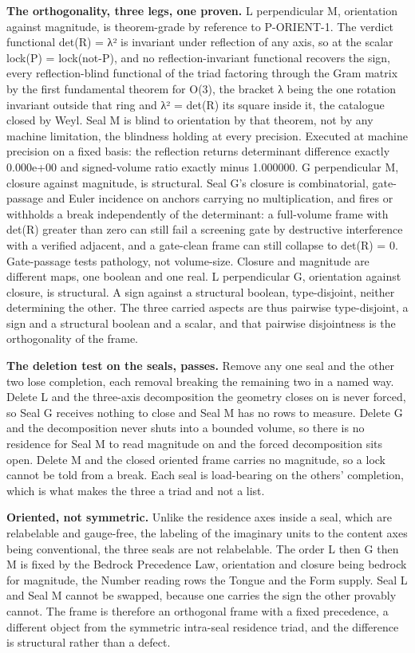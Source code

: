 \documentclass[10pt,twocolumn]{article}
\begin{document}
\textbf{The orthogonality, three legs, one proven.} L perpendicular M,
orientation against magnitude, is theorem-grade by reference to
P-ORIENT-1. The verdict functional det(R) = λ² is invariant under
reflection of any axis, so at the scalar lock(P) = lock(not-P), and no
reflection-invariant functional recovers the sign, every
reflection-blind functional of the triad factoring through the Gram
matrix by the first fundamental theorem for O(3), the bracket λ being
the one rotation invariant outside that ring and λ² = det(R) its square
inside it, the catalogue closed by Weyl. Seal M is blind to orientation
by that theorem, not by any machine limitation, the blindness holding at
every precision. Executed at machine precision on a fixed basis: the
reflection returns determinant difference exactly 0.000e+00 and
signed-volume ratio exactly minus 1.000000. G perpendicular M, closure
against magnitude, is structural. Seal G's closure is combinatorial,
gate-passage and Euler incidence on anchors carrying no multiplication,
and fires or withholds a break independently of the determinant: a
full-volume frame with det(R) greater than zero can still fail a
screening gate by destructive interference with a verified adjacent, and
a gate-clean frame can still collapse to det(R) = 0. Gate-passage tests
pathology, not volume-size. Closure and magnitude are different maps,
one boolean and one real. L perpendicular G, orientation against
closure, is structural. A sign against a structural boolean,
type-disjoint, neither determining the other. The three carried aspects
are thus pairwise type-disjoint, a sign and a structural boolean and a
scalar, and that pairwise disjointness is the orthogonality of the
frame.

\textbf{The deletion test on the seals, passes.} Remove any one seal and
the other two lose completion, each removal breaking the remaining two
in a named way. Delete L and the three-axis decomposition the geometry
closes on is never forced, so Seal G receives nothing to close and Seal
M has no rows to measure. Delete G and the decomposition never shuts
into a bounded volume, so there is no residence for Seal M to read
magnitude on and the forced decomposition sits open. Delete M and the
closed oriented frame carries no magnitude, so a lock cannot be told
from a break. Each seal is load-bearing on the others' completion, which
is what makes the three a triad and not a list.

\textbf{Oriented, not symmetric.} Unlike the residence axes inside a
seal, which are relabelable and gauge-free, the labeling of the
imaginary units to the content axes being conventional, the three seals
are not relabelable. The order L then G then M is fixed by the Bedrock
Precedence Law, orientation and closure being bedrock for magnitude, the
Number reading rows the Tongue and the Form supply. Seal L and Seal M
cannot be swapped, because one carries the sign the other provably
cannot. The frame is therefore an orthogonal frame with a fixed
precedence, a different object from the symmetric intra-seal residence
triad, and the difference is structural rather than a defect.
\end{document}
